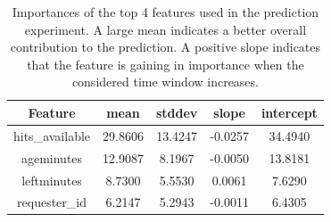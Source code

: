 \begin{table}[t!]
\begin{center}
\scriptsize
\caption {Importances of the top 4 features used in the prediction experiment. A large mean indicates a better overall contribution to the prediction. A positive slope indicates that the feature is gaining in importance when the considered time window increases.}
\begin{tabular}{|c|c|c|c|c|}
\hline
Feature              & mean      & stddev    & slope     & intercept \\
\hline
hits\_available      & 29.8606 & 13.4247 & -0.0257 & 34.4940 \\
ageminutes           & 12.9087 &  8.1967 & -0.0050 & 13.8181 \\
leftminutes          &  8.7300 &  5.5530 & 0.0061 & 7.6290 \\
requester\_id        &  6.2147 &  5.2943 & -0.0011 & 6.4305 \\

\end{tabular}
\end{center}
\end{table}
